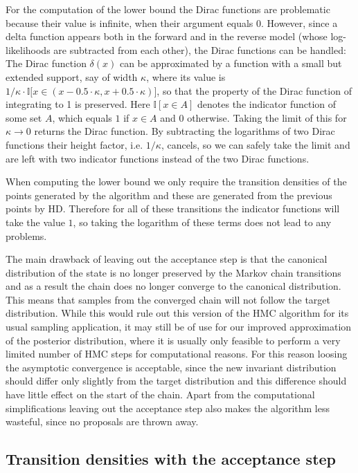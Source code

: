 \documentclass[12pt]{scrartcl}
\begin{document}
For the computation of the lower bound the Dirac functions are problematic because their value is infinite, when their argument equals $0$. However, since a delta function appears both in the forward and in the reverse model (whose log-likelihoods are subtracted from each other), the Dirac functions can be handled: The Dirac function $\delta(x)$ can be approximated by a function with a small but extended support, say of width $\kappa$, where its value is $1/\kappa \cdot \mathbb{I}\big[x \in (x - 0.5 \cdot \kappa, x + 0.5 \cdot \kappa)\big]$, so that the property of the Dirac function of integrating to 1 is preserved. Here $\mathbb{I}[x \in A]$ denotes the indicator function of some set $A$, which equals $1$ if $x \in A$ and $0$ otherwise. Taking the limit of this for $\kappa \rightarrow 0$ returns the Dirac function. By subtracting the logarithms of two Dirac functions their height factor, i.e. $1/\kappa$, cancels, so we can safely take the limit and are left with two indicator functions instead of the two Dirac functions.

When computing the lower bound we only require the transition densities of the points generated by the algorithm and these are generated from the previous points by HD. Therefore for all of these transitions the indicator functions will take the value $1$, so taking the logarithm of these terms does not lead to any problems.

The main drawback of leaving out the acceptance step is that the canonical distribution of the state is no longer preserved by the Markov chain transitions and as a result the chain does no longer converge to the canonical distribution. This means that samples from the converged chain will not follow the target distribution. While this would rule out this version of the HMC algorithm for its usual sampling application, it may still be of use for our improved approximation of the posterior distribution, where it is usually only feasible to perform a very limited number of HMC steps for computational reasons. For this reason loosing the asymptotic convergence is acceptable, since the new invariant distribution should differ only slightly from the target distribution and this difference should have little effect on the start of the chain. Apart from the computational simplifications leaving out the acceptance step also makes the algorithm less wasteful, since no proposals are thrown away.

\subsection{Transition densities with the acceptance step}
\end{document}
